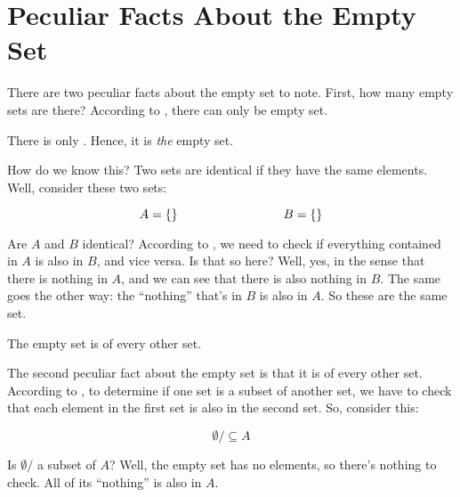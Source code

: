 \documentclass[../../../main.tex]{subfiles}
\begin{document}
\section{Peculiar Facts About the Empty Set}
\label{sec:peculiar-facts-about-the-empty-set}

There are two peculiar facts about the empty set to note. First, how many empty sets are there? According to , there can only be  empty set.

\begin{aside}
  \begin{remark}
    There is only . Hence, it is \emph{the} empty set.
  \end{remark}
\end{aside}

How do we know this? Two sets are identical if they have the same elements. Well, consider these two sets:

\begin{equation*}
  A = \{ \} \hskip 3cm B = \{ \}
\end{equation*}

Are $A$ and $B$ identical? According to , we need to check if everything contained in $A$ is also in $B$, and vice versa. Is that so here? Well, yes, in the sense that there is nothing in $A$, and we can see that there is also nothing in $B$. The same goes the other way: the ``nothing'' that's in $B$ is also in $A$. So these are the same set.

\begin{aside}
  \begin{remark}
    The empty set is  of every other set.
  \end{remark}
\end{aside}

The second peculiar fact about the empty set is that it is  of every other set. According to , to determine if one set is a subset of another set, we have to check that each element in the first set is also in the second set. So, consider this:

\begin{equation*}
  \emptyset/ \subseteq A
\end{equation*}

Is $\emptyset/$ a subset of $A$? Well, the empty set has no elements, so there's nothing to check. All of its ``nothing'' is also in $A$. 
\end{document}
